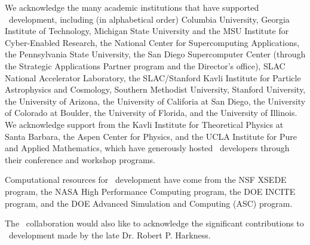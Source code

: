 We acknowledge the  many academic institutions that have supported \enzo\
development, including (in alphabetical order)
Columbia University,
Georgia Institute of Technology,
Michigan State University and the MSU Institute for Cyber-Enabled
Research, 
the National Center for Supercomputing Applications, 
the Pennsylvania State University,
 the San Diego Supercomputer Center (through the Strategic Applications
Partner program and the Director’s office),
SLAC National Accelerator Laboratory,
the SLAC/Stanford Kavli Institute for Particle
Astrophysics and Cosmology,  
Southern Methodist University,
Stanford University,
the University of Arizona,
the University of Califoria at San Diego, 
the University of Colorado at Boulder,
the University of Florida,
and the University of Illinois.
We acknowledge support from the Kavli Institute for Theoretical
Physics at Santa Barbara, the Aspen Center for Physics, and the UCLA
Institute for Pure and Applied Mathematics, which have
generously hosted \enzo\ developers through their conference and
workshop programs.

Computational resources for \enzo\ development have come from the NSF
XSEDE program, the NASA High Performance Computing program, the DOE INCITE
program, and the DOE Advanced Simulation and Computing (ASC) program.

The \enzo\ collaboration would also like to acknowledge the significant contributions to
\enzo\ development made by the late Dr. Robert P. Harkness. 

